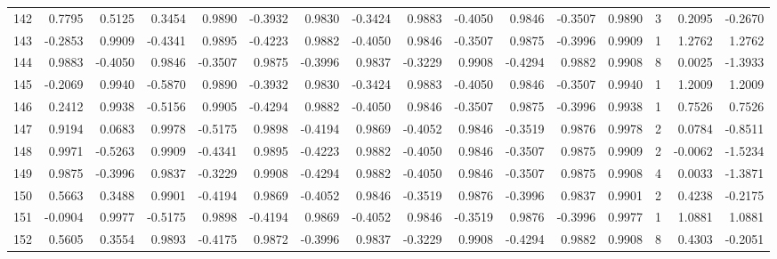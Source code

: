 \begin{tabular}{lrrrrrrrrrrrrrrr}
142 &      0.7795 &  0.5125 &  0.3454 &  0.9890 & -0.3932 &  0.9830 & -0.3424 &  0.9883 & -0.4050 &  0.9846 &  -0.3507 &     0.9890 &      3 &                    0.2095 &                    -0.2670 \\
143 &     -0.2853 &  0.9909 & -0.4341 &  0.9895 & -0.4223 &  0.9882 & -0.4050 &  0.9846 & -0.3507 &  0.9875 &  -0.3996 &     0.9909 &      1 &                    1.2762 &                     1.2762 \\
144 &      0.9883 & -0.4050 &  0.9846 & -0.3507 &  0.9875 & -0.3996 &  0.9837 & -0.3229 &  0.9908 & -0.4294 &   0.9882 &     0.9908 &      8 &                    0.0025 &                    -1.3933 \\
145 &     -0.2069 &  0.9940 & -0.5870 &  0.9890 & -0.3932 &  0.9830 & -0.3424 &  0.9883 & -0.4050 &  0.9846 &  -0.3507 &     0.9940 &      1 &                    1.2009 &                     1.2009 \\
146 &      0.2412 &  0.9938 & -0.5156 &  0.9905 & -0.4294 &  0.9882 & -0.4050 &  0.9846 & -0.3507 &  0.9875 &  -0.3996 &     0.9938 &      1 &                    0.7526 &                     0.7526 \\
147 &      0.9194 &  0.0683 &  0.9978 & -0.5175 &  0.9898 & -0.4194 &  0.9869 & -0.4052 &  0.9846 & -0.3519 &   0.9876 &     0.9978 &      2 &                    0.0784 &                    -0.8511 \\
148 &      0.9971 & -0.5263 &  0.9909 & -0.4341 &  0.9895 & -0.4223 &  0.9882 & -0.4050 &  0.9846 & -0.3507 &   0.9875 &     0.9909 &      2 &                   -0.0062 &                    -1.5234 \\
149 &      0.9875 & -0.3996 &  0.9837 & -0.3229 &  0.9908 & -0.4294 &  0.9882 & -0.4050 &  0.9846 & -0.3507 &   0.9875 &     0.9908 &      4 &                    0.0033 &                    -1.3871 \\
150 &      0.5663 &  0.3488 &  0.9901 & -0.4194 &  0.9869 & -0.4052 &  0.9846 & -0.3519 &  0.9876 & -0.3996 &   0.9837 &     0.9901 &      2 &                    0.4238 &                    -0.2175 \\
151 &     -0.0904 &  0.9977 & -0.5175 &  0.9898 & -0.4194 &  0.9869 & -0.4052 &  0.9846 & -0.3519 &  0.9876 &  -0.3996 &     0.9977 &      1 &                    1.0881 &                     1.0881 \\
152 &      0.5605 &  0.3554 &  0.9893 & -0.4175 &  0.9872 & -0.3996 &  0.9837 & -0.3229 &  0.9908 & -0.4294 &   0.9882 &     0.9908 &      8 &                    0.4303 &                    -0.2051 \\

\end{tabular}
